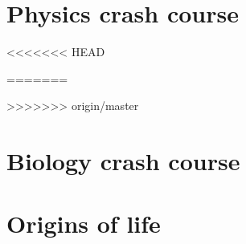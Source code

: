 \documentclass[DIV=calc, paper=a4, fontsize=12pt]{scrartcl}	 %
\begin{document}
\begin{multicols}{2}

\end{multicols} \noindent\makebox[\linewidth]{\rule{\paperwidth}{0.4pt}}

\section{Physics crash course}

\begin{multicols}{2}

<<<<<<< HEAD



=======

>>>>>>> origin/master





\end{multicols} \noindent\makebox[\linewidth]{\rule{\paperwidth}{0.4pt}}


\section{Biology crash course}

\begin{multicols}{2}



\end{multicols} \noindent\makebox[\linewidth]{\rule{\paperwidth}{0.4pt}}


\section{Origins of life}

\begin{multicols}{2}



\end{multicols} \noindent\makebox[\linewidth]{\rule{\paperwidth}{0.4pt}}
\end{document}

